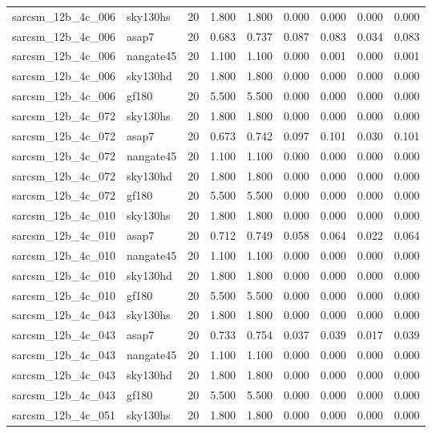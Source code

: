 \begin{tabular}{llrrrrrrr}
sarcsm\_12b\_4c\_006 & sky130hs & 20 & 1.800 & 1.800 & 0.000 & 0.000 & 0.000 & 0.000 \\
sarcsm\_12b\_4c\_006 & asap7 & 20 & 0.683 & 0.737 & 0.087 & 0.083 & 0.034 & 0.083 \\
sarcsm\_12b\_4c\_006 & nangate45 & 20 & 1.100 & 1.100 & 0.000 & 0.001 & 0.000 & 0.001 \\
sarcsm\_12b\_4c\_006 & sky130hd & 20 & 1.800 & 1.800 & 0.000 & 0.000 & 0.000 & 0.000 \\
sarcsm\_12b\_4c\_006 & gf180 & 20 & 5.500 & 5.500 & 0.000 & 0.000 & 0.000 & 0.000 \\
sarcsm\_12b\_4c\_072 & sky130hs & 20 & 1.800 & 1.800 & 0.000 & 0.000 & 0.000 & 0.000 \\
sarcsm\_12b\_4c\_072 & asap7 & 20 & 0.673 & 0.742 & 0.097 & 0.101 & 0.030 & 0.101 \\
sarcsm\_12b\_4c\_072 & nangate45 & 20 & 1.100 & 1.100 & 0.000 & 0.000 & 0.000 & 0.000 \\
sarcsm\_12b\_4c\_072 & sky130hd & 20 & 1.800 & 1.800 & 0.000 & 0.000 & 0.000 & 0.000 \\
sarcsm\_12b\_4c\_072 & gf180 & 20 & 5.500 & 5.500 & 0.000 & 0.000 & 0.000 & 0.000 \\
sarcsm\_12b\_4c\_010 & sky130hs & 20 & 1.800 & 1.800 & 0.000 & 0.000 & 0.000 & 0.000 \\
sarcsm\_12b\_4c\_010 & asap7 & 20 & 0.712 & 0.749 & 0.058 & 0.064 & 0.022 & 0.064 \\
sarcsm\_12b\_4c\_010 & nangate45 & 20 & 1.100 & 1.100 & 0.000 & 0.000 & 0.000 & 0.000 \\
sarcsm\_12b\_4c\_010 & sky130hd & 20 & 1.800 & 1.800 & 0.000 & 0.000 & 0.000 & 0.000 \\
sarcsm\_12b\_4c\_010 & gf180 & 20 & 5.500 & 5.500 & 0.000 & 0.000 & 0.000 & 0.000 \\
sarcsm\_12b\_4c\_043 & sky130hs & 20 & 1.800 & 1.800 & 0.000 & 0.000 & 0.000 & 0.000 \\
sarcsm\_12b\_4c\_043 & asap7 & 20 & 0.733 & 0.754 & 0.037 & 0.039 & 0.017 & 0.039 \\
sarcsm\_12b\_4c\_043 & nangate45 & 20 & 1.100 & 1.100 & 0.000 & 0.000 & 0.000 & 0.000 \\
sarcsm\_12b\_4c\_043 & sky130hd & 20 & 1.800 & 1.800 & 0.000 & 0.000 & 0.000 & 0.000 \\
sarcsm\_12b\_4c\_043 & gf180 & 20 & 5.500 & 5.500 & 0.000 & 0.000 & 0.000 & 0.000 \\
sarcsm\_12b\_4c\_051 & sky130hs & 20 & 1.800 & 1.800 & 0.000 & 0.000 & 0.000 & 0.000 \\

\end{tabular}
